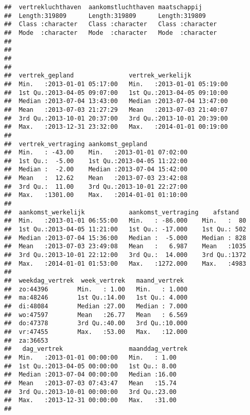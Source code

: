 \documentclass[]{memoir}
\begin{document}
\begin{verbatim}
##  vertrekluchthaven  aankomstluchthaven maatschappij      
##  Length:319809      Length:319809      Length:319809     
##  Class :character   Class :character   Class :character  
##  Mode  :character   Mode  :character   Mode  :character  
##                                                          
##                                                          
##                                                          
##                                                          
##  vertrek_gepland               vertrek_werkelijk            
##  Min.   :2013-01-01 05:17:00   Min.   :2013-01-01 05:19:00  
##  1st Qu.:2013-04-05 09:07:00   1st Qu.:2013-04-05 09:10:00  
##  Median :2013-07-04 13:43:00   Median :2013-07-04 13:47:00  
##  Mean   :2013-07-03 21:27:29   Mean   :2013-07-03 21:40:07  
##  3rd Qu.:2013-10-01 20:37:00   3rd Qu.:2013-10-01 20:39:00  
##  Max.   :2013-12-31 23:32:00   Max.   :2014-01-01 00:19:00  
##                                                             
##  vertrek_vertraging aankomst_gepland             
##  Min.   : -43.00    Min.   :2013-01-01 07:02:00  
##  1st Qu.:  -5.00    1st Qu.:2013-04-05 11:22:00  
##  Median :  -2.00    Median :2013-07-04 15:42:00  
##  Mean   :  12.62    Mean   :2013-07-03 23:42:08  
##  3rd Qu.:  11.00    3rd Qu.:2013-10-01 22:27:00  
##  Max.   :1301.00    Max.   :2014-01-01 01:10:00  
##                                                  
##  aankomst_werkelijk            aankomst_vertraging    afstand    
##  Min.   :2013-01-01 06:55:00   Min.   : -86.000    Min.   :  80  
##  1st Qu.:2013-04-05 11:21:00   1st Qu.: -17.000    1st Qu.: 502  
##  Median :2013-07-04 15:36:00   Median :  -5.000    Median : 828  
##  Mean   :2013-07-03 23:49:08   Mean   :   6.987    Mean   :1035  
##  3rd Qu.:2013-10-01 22:12:00   3rd Qu.:  14.000    3rd Qu.:1372  
##  Max.   :2014-01-01 01:53:00   Max.   :1272.000    Max.   :4983  
##                                                                  
##  weekdag_vertrek  week_vertrek   maand_vertrek   
##  zo:44396        Min.   : 1.00   Min.   : 1.000  
##  ma:48246        1st Qu.:14.00   1st Qu.: 4.000  
##  di:48084        Median :27.00   Median : 7.000  
##  wo:47597        Mean   :26.77   Mean   : 6.569  
##  do:47378        3rd Qu.:40.00   3rd Qu.:10.000  
##  vr:47455        Max.   :53.00   Max.   :12.000  
##  za:36653                                        
##   dag_vertrek                  maanddag_vertrek
##  Min.   :2013-01-01 00:00:00   Min.   : 1.00   
##  1st Qu.:2013-04-05 00:00:00   1st Qu.: 8.00   
##  Median :2013-07-04 00:00:00   Median :16.00   
##  Mean   :2013-07-03 07:43:47   Mean   :15.74   
##  3rd Qu.:2013-10-01 00:00:00   3rd Qu.:23.00   
##  Max.   :2013-12-31 00:00:00   Max.   :31.00   
## 
\end{verbatim}
\end{document}
